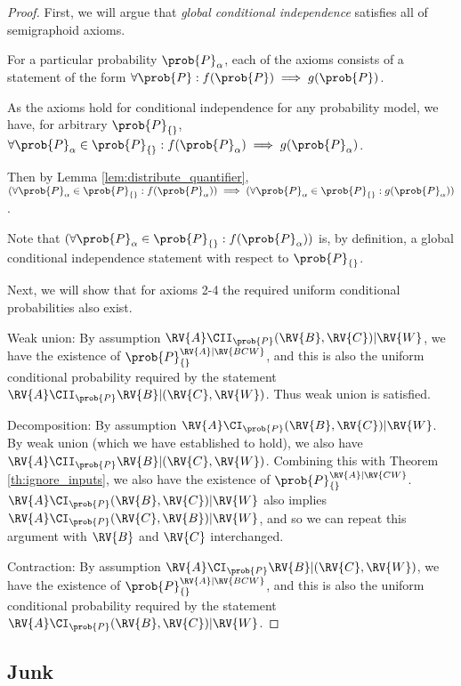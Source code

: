 \begin{proof}
First, we will argue that \emph{global conditional independence} satisfies all of semigraphoid axioms.

For a particular probability $\prob{P}_\alpha$, each of the axioms consists of a statement of the form $\forall \prob{P}: f(\prob{P})\implies g(\prob{P})$.

As the axioms hold for conditional independence for any probability model, we have, for arbitrary $\prob{P}_{\{\}}$, $\forall \prob{P}_\alpha\in \prob{P}_{\{\}}: f(\prob{P}_{\alpha}) \implies g(\prob{P}_\alpha)$. 

Then by Lemma \ref{lem:distribute_quantifier}, $(\forall \prob{P}_\alpha\in \prob{P}_{\{\}}: f(\prob{P}_{\alpha}))\implies (\forall \prob{P}_\alpha\in \prob{P}_{\{\}}: g(\prob{P}_{\alpha}))$.

Note that $(\forall \prob{P}_\alpha\in \prob{P}_{\{\}}: f(\prob{P}_{\alpha}))$ is, by definition, a global conditional independence statement with respect to $\prob{P}_{\{\}}$.

Next, we will show that for axioms 2-4 the required uniform conditional probabilities also exist. 

Weak union: By assumption $\RV{A}\CII_{\prob{P}} (\RV{B},\RV{C})|\RV{W}$, we have the existence of $\prob{P}_{\{\}}^{\RV{A}|\RV{BCW}}$, and this is also the uniform conditional probability required by the statement $\RV{A}\CII_{\prob{P}}\RV{B}|(\RV{C},\RV{W})$. Thus weak union is satisfied.

Decomposition: By assumption $\RV{A}\CI_{\prob{P}} (\RV{B},\RV{C})|\RV{W}$. By weak union (which we have established to hold), we also have $\RV{A}\CII_{\prob{P}}\RV{B}|(\RV{C},\RV{W})$. Combining this with Theorem \ref{th:ignore_inputs}, we also have the existence of $\prob{P}_{\{\}}^{\RV{A}|\RV{CW}}$. $\RV{A}\CI_{\prob{P}} (\RV{B},\RV{C})|\RV{W}$ also implies $\RV{A}\CI_{\prob{P}} (\RV{C},\RV{B})|\RV{W}$, and so we can repeat this argument with $\RV{B}$ and $\RV{C}$ interchanged.

Contraction: By assumption $\RV{A}\CI_{\prob{P}}\RV{B}|(\RV{C},\RV{W})$, we have the existence of $\prob{P}_{\{\}}^{\RV{A}|\RV{BCW}}$, and this is also the uniform conditional probability required by the statement $\RV{A}\CI_{\prob{P}}(\RV{B},\RV{C})|\RV{W}$.
\end{proof}






\subsection{Junk}

